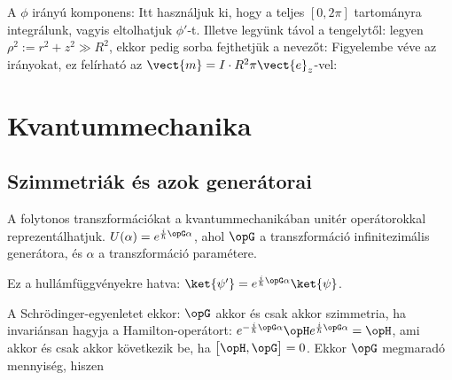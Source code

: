     A $\phi$ irányú komponens:
    Itt használjuk ki, hogy a teljes $[0,2\pi]$ tartományra integrálunk, vagyis eltolhatjuk $\phi'$-t.
   Illetve legyünk távol a tengelytől: legyen $\rho^2:=r^2+z^2\gg R^2$, ekkor pedig sorba fejthetjük a nevezőt:
    Figyelembe véve az irányokat, ez felírható az $\vect{m}=I\cdot R^2\pi\vect{e}_z$-vel:
  
 \section{Kvantummechanika}
   
  \subsection{Szimmetriák és azok generátorai}
   
   A folytonos transzformációkat a kvantummechanikában unitér operátorokkal reprezentálhatjuk. $U(\alpha)=e^{\frac{i}{\hbar}\opG\alpha}$, ahol $\opG$ a transzformáció infinitezimális generátora, és $\alpha$ a transzformáció paramétere. 
   
   Ez a hullámfüggvényekre hatva: $\ket{\psi'}=e^{\frac{i}{\hbar}\opG\alpha}\ket{\psi}$. 
   
   A Schrödinger-egyenletet ekkor:
   $\opG$ akkor és csak akkor szimmetria, ha invariánsan hagyja a Hamilton-operátort: $e^{-\frac{i}{\hbar}\opG\alpha}\opH e^{\frac{i}{\hbar}\opG\alpha}=\opH$, ami akkor és csak akkor következik be, ha $\big[\opH,\opG\big]=0$.
   Ekkor $\opG$ megmaradó mennyiség, hiszen
   
